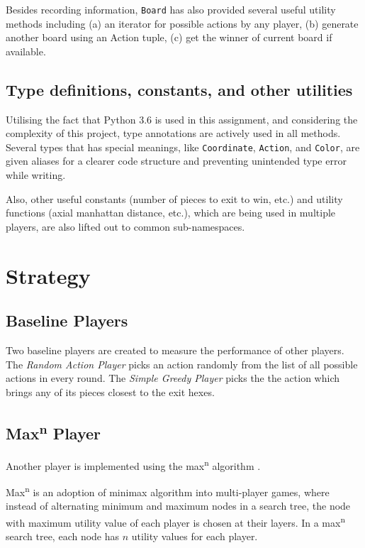 \documentclass[12pt,a4paper]{article}
\newcommand{\maxn}{max\textsuperscript{n}}
\newcommand{\Maxn}{Max\textsuperscript{n}}
\begin{document}
Besides recording information, \texttt{Board} has also provided several useful
utility methods including (a) an iterator for possible actions by any player,
(b) generate another board using an Action tuple, (c) get the winner of current
board if available.

\subsection{Type definitions, constants, and other utilities} \label{typedef}
Utilising the fact
that Python 3.6 is used in this assignment, and considering the complexity of
this project, type annotations \cite{PEP484} are actively used in all 
methods. Several types that has special meanings, like \texttt{Coordinate},
\texttt{Action}, and \texttt{Color}, are given aliases for a clearer code
structure and preventing unintended type error while writing.

Also, other useful constants (number of pieces to exit to win, etc.) and 
utility functions (axial manhattan distance, etc.), which are being used
in multiple players, are also lifted out to common sub-namespaces.

\section{Strategy}
\subsection{Baseline Players}
Two baseline players are created to measure the performance of other players.
The \textit{Random Action Player} picks an action randomly from the list
of all possible actions in every round. The \textit{Simple Greedy Player}
picks the the action which brings any of its pieces closest to the exit hexes.

\subsection{\Maxn{} Player}
Another player is implemented using the \maxn{} algorithm \cite{Luckhardt1986}.

\Maxn{} is an adoption of minimax algorithm into multi-player games, where
instead of alternating minimum and maximum nodes in a search tree, the node
with maximum utility value of each player is chosen at their layers. 
In a \maxn{} search tree, each node has $n$ utility values for each player.
\end{document}
